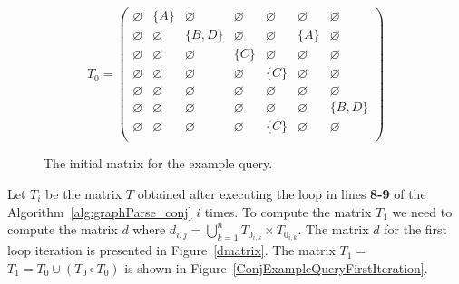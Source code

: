 \begin{figure}[h]
    \[
    T_0 = \begin{pmatrix}
    \varnothing & \{A\} & \varnothing & \varnothing & \varnothing & \varnothing & \varnothing \\
    
    \varnothing & \varnothing & \{B, D\} & \varnothing & \varnothing & \{A\} & \varnothing \\
    
    \varnothing & \varnothing & \varnothing & \{C\} & \varnothing & \varnothing & \varnothing \\
    
    \varnothing & \varnothing & \varnothing & \varnothing & \{C\} & \varnothing & \varnothing \\
    
    \varnothing & \varnothing & \varnothing & \varnothing & \varnothing & \varnothing & \varnothing \\
    
    \varnothing & \varnothing & \varnothing & \varnothing & \varnothing & \varnothing & \{B, D\} \\
    
    \varnothing & \varnothing & \varnothing & \varnothing & \{C\} & \varnothing & \varnothing \\
    \end{pmatrix}
    \]
    \caption{The initial matrix for the example query.}
    \label{ConjExampleQueryInitMatrix}
\end{figure}

Let $T_i$ be the matrix $T$ obtained after executing the loop in lines \textbf{8-9} of the Algorithm~\ref{alg:graphParse_conj} $i$ times. To compute the matrix $T_1$ we need to compute the matrix $d$ where $d_{i,j} = \bigcup^{n}_{k=1}{T_{0_{i,k}} \times T_{0_{i,k}}}$. The matrix $d$ for the first loop iteration is presented in Figure~\ref{dmatrix}. The matrix $T_1 = $ $T_1 = T_0 \cup (T_0 \circ T_0)$ is shown in Figure~\ref{ConjExampleQueryFirstIteration}.

